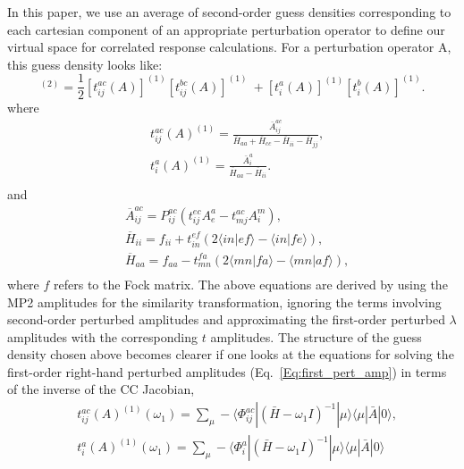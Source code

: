In this paper, we use an average of second-order guess densities corresponding to each cartesian component of an appropriate perturbation operator to define our virtual space for correlated response calculations. For a perturbation operator A, this guess density looks like:
\begin{equation}
[{D^A_{ab}}]^{(2)} = \frac{1}{2}[t^{ac}_{ij}(A)]^{(1)}[t^{bc}_{ij}(A)]^{(1)} \
+ [t^{a}_{i}(A)]^{(1)} [t^{b}_{i}(A)]^{(1)}.
\end{equation}
where
\begin{equation}
\begin{split}
& t^{ac}_{ij}(A)^{(1)} = \frac{\bar{A}^{ac}_{ij}}{\overbar{H}_{aa} + \overbar{H}_{cc} - \overbar{H}_{ii} - \overbar{H}_{jj}},\\
& t^{a}_{i}(A)^{(1)} = \frac{\bar{A}^{a}_{i}}{\overbar{H}_{aa} - \overbar{H}_{ii}}.\\
\end{split}
\end{equation}
and %
\begin{equation}
\begin{split}
& \overbar{A}^{ac}_{ij} = P_{ij}^{ac}(t^{ec}_{ij}A^a_e - t^{ac}_{mj}A^m_i) ,\\
& \overbar{H}_{ii} =  f_{ii} + t^{ef}_{in}(2 \langle in|ef \rangle - \langle in|fe \rangle),\\
& \overbar{H}_{aa} =  f_{aa} - t^{fa}_{mn}(2 \langle mn|fa \rangle - \langle mn|af \rangle), \\
\end{split}
\end{equation}
where $f$ refers to the Fock matrix. The above equations are derived by 
using the MP2 amplitudes for the similarity transformation, ignoring the terms 
involving second-order perturbed amplitudes and approximating the first-order 
perturbed $\lambda$ amplitudes with the corresponding $t$ amplitudes. 
The structure of the guess density chosen above becomes clearer 
if one looks at the equations for solving the first-order right-hand perturbed amplitudes (Eq.~\ref{Eq:first_pert_amp}) in terms of the inverse of the CC Jacobian,
\begin{equation}
\begin{split}
& t^{ac}_{ij}(A)^{(1)}(\omega_1) = \sum_\mu - \langle\Phi_{ij}^{ac}| {(\bar{H} -\omega_1 I)}^{-1} |
\mu\rangle\langle \mu| \bar{A} | 0\rangle, \\
& t^{a}_{i}(A)^{(1)}(\omega_1) = \sum_\mu -\langle\Phi_{i}^{a}| {(\bar{H} -\omega_1 I)}^{-1} |
\mu\rangle \langle \mu| \bar{A} | 0\rangle \\
\end{split}
\end{equation}
